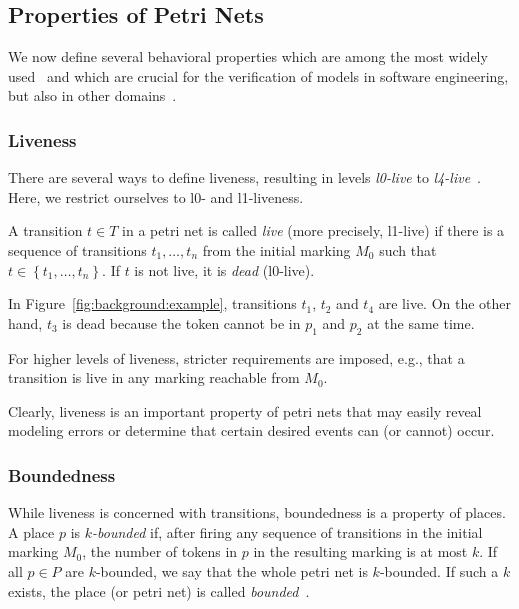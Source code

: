 \subsection{Properties of Petri Nets}\label{sec:background:properties}

We now define several behavioral properties which are among the most widely used~\cite{murata1989petri} and which are crucial for the verification of models in software engineering, but also in other domains~\cite{chaouiya2007petri}.

\subsubsection{Liveness}

There are several ways to define liveness, resulting in levels \emph{l0-live} to \emph{l4-live}~\cite{murata1989petri}. Here, we restrict ourselves to l0- and l1-liveness.

A transition $t\in T$ in a petri net is called \emph{live} (more precisely, l1-live) if there is a sequence of transitions $t_1,\ldots,t_n$ from the initial marking $M_0$ such that $t\in\left\{t_1,\ldots,t_n\right\}$. If $t$ is not live, it is \emph{dead} (l0-live).

In Figure~\ref{fig:background:example}, transitions $t_1$, $t_2$ and $t_4$ are live. On the other hand, $t_3$ is dead because the token cannot be in $p_1$ and $p_2$ at the same time.

For higher levels of liveness, stricter requirements are imposed, e.g., that a transition is live in any marking reachable from $M_0$.

Clearly, liveness is an important property of petri nets that may easily reveal modeling errors or determine that certain desired events can (or cannot) occur.

\subsubsection{Boundedness}

While liveness is concerned with transitions, boundedness is a property of places. A place $p$ is \emph{$k$-bounded} if, after firing any sequence of transitions in the initial marking $M_0$, the number of tokens in $p$ in the resulting marking is at most $k$. If all $p\in P$ are $k$-bounded, we say that the whole petri net is $k$-bounded. If such a $k$ exists, the place (or petri net) is called \emph{bounded}~\cite{murata1989petri}.

